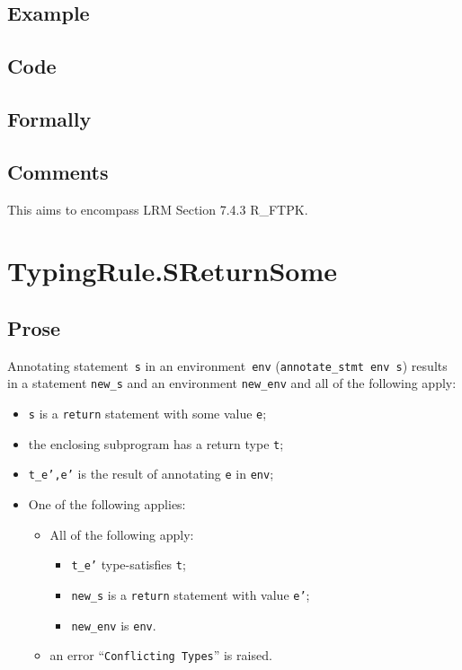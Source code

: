 \documentclass{book}
\begin{document}
  \subsection{Example}

  \subsection{Code}

\begin{emptyformal}
    \subsection{Formally}
\end{emptyformal}

\subsection{Comments}
    This aims to encompass LRM Section 7.4.3 R\_FTPK.

\section{TypingRule.SReturnSome \label{sec:TypingRule.SReturnSome}}

  \subsection{Prose}
Annotating statement~\texttt{s} in an environment~\texttt{env}
(\texttt{annotate\_stmt env s}) results in a statement \texttt{new\_s} and an
environment \texttt{new\_env} and all of the following apply:
   \begin{itemize}
   \item \texttt{s} is a \texttt{return} statement with some value \texttt{e};
   \item the enclosing subprogram has a return type \texttt{t};
   \item \texttt{t\_e',e'} is the result of annotating \texttt{e} in \texttt{env};
   \item One of the following applies:
     \begin{itemize}
     \item All of the following apply:
       \begin{itemize}
       \item \texttt{t\_e'} type-satisfies \texttt{t};
       \item \texttt{new\_s} is a \texttt{return} statement with value \texttt{e'};
       \item \texttt{new\_env} is \texttt{env}.
       \end{itemize}
     \item an error ``\texttt{Conflicting Types}'' is raised.
     \end{itemize}
   \end{itemize}
\end{document}
